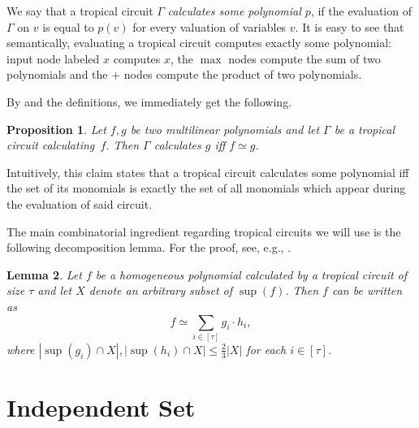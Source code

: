 \documentclass[11pt,a4paper]{article}
\newtheorem{lemma}{Lemma}[section]
\newtheorem{prop}[lemma]{Proposition}
\begin{document}
We say that a tropical circuit $\Gamma$ \emph{calculates some polynomial $p$}, if the evaluation of $\Gamma$ on $v$ is equal to $p(v)$ for every valuation of variables $v$. It is easy to see that semantically, evaluating a tropical circuit computes exactly some polynomial: input node labeled $x$ computes $x$, the $\max$ nodes compute the sum of two polynomials and the $+$ nodes compute the product of two polynomials.


By  and the definitions, we immediately get the following.

\begin{prop}\label{prop:tc_semantics}
    Let $f, g$ be two multilinear polynomials and let $\Gamma$ be a tropical circuit calculating~$f$. Then $\Gamma$ calculates $g$ iff $f \simeq g$.
\end{prop}
Intuitively, this claim states that a tropical circuit calculates some polynomial iff the set of its monomials is exactly the set of all monomials which appear during the evaluation of said circuit.

The main combinatorial ingredient regarding tropical circuits we will use is the following decomposition lemma. For the proof, see, e.g., \cite[Lemma 3.4]{Jukna2023}.
\begin{lemma}\label{lem:tc_decomposition}
    Let $f$ be a homogeneous polynomial calculated by a tropical circuit of size $\tau$ and let $X$ denote an arbitrary subset of $\sup(f)$. Then $f$ can be written as
    $$
        f \simeq \sum_{i \in [\tau]} g_i \cdot h_i,
    $$
    where $|\sup(g_i) \cap X|, |\sup(h_i) \cap X| \leq \frac{2}{3}|X|$ for each $i \in [\tau]$.
\end{lemma}





\section{Independent Set}
\label{sec:mwis}
\end{document}
